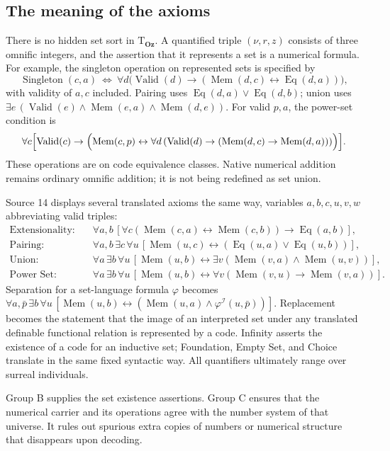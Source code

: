 \documentclass[11pt,letterpaper]{article}
\theoremstyle{definition}
\theoremstyle{remark}
\newcommand{\I}{\mathcal I}
\newcommand{\Oz}{\mathbf{Oz}}
\newcommand{\Valid}{\operatorname{Valid}}
\newcommand{\Eqc}{\operatorname{Eq}}
\newcommand{\Memc}{\operatorname{Mem}}
\newcommand{\Tth}{\mathrm{T}}
\begin{document}
\subsection{The meaning of the axioms}

There is no hidden set sort in $\Tth_{\Oz}$. A quantified triple $(\nu,r,z)$
consists of three omnific integers, and the assertion that it represents a set is
a numerical formula. For example, the singleton operation on represented sets is
specified by
\[
 \operatorname{Singleton}(c,a)\ \Longleftrightarrow\
 \forall d\bigl(\Valid(d)\to(\Memc(d,c)\leftrightarrow\Eqc(d,a))\bigr),
\]
with validity of $a,c$ included. Pairing uses $\Eqc(d,a)\lor\Eqc(d,b)$; union uses
$\exists e\,(\Valid(e)\land\Memc(e,a)\land\Memc(d,e))$. For valid $p,a$, the
power-set condition is
\[
 \forall c\Bigl[\Valid(c)\to\Bigl(\Memc(c,p)\leftrightarrow
 \forall d\,(\Valid(d)\to(\Memc(d,c)\to\Memc(d,a)))\Bigr)\Bigr].
\]
These operations are on code equivalence classes. Native numerical addition
remains ordinary omnific addition; it is not being redefined as set union.

Source 14 displays several translated axioms the same way, variables
$a,b,c,u,v,w$ abbreviating valid triples:
\begin{align*}
 \text{Extensionality:}\quad&\forall a,b\,[\forall c(\Memc(c,a)\leftrightarrow \Memc(c,b))\to \Eqc(a,b)],\\
 \text{Pairing:}\quad&\forall a,b\,\exists c\,\forall u\,[\Memc(u,c)\leftrightarrow(\Eqc(u,a)\lor \Eqc(u,b))],\\
 \text{Union:}\quad&\forall a\,\exists b\,\forall u\,[\Memc(u,b)\leftrightarrow\exists v(\Memc(v,a)\land \Memc(u,v))],\\
 \text{Power Set:}\quad&\forall a\,\exists b\,\forall u\,[\Memc(u,b)\leftrightarrow\forall v(\Memc(v,u)\to \Memc(v,a))].
\end{align*}
Separation for a set-language formula $\varphi$ becomes
$\forall a,\bar p\,\exists b\,\forall u\,[\Memc(u,b)\leftrightarrow(\Memc(u,a)\land\varphi^\I(u,\bar p))]$.
Replacement becomes the statement that the image of an interpreted set under any
translated definable functional relation is represented by a code. Infinity
asserts the existence of a code for an inductive set; Foundation, Empty Set, and
Choice translate in the same fixed syntactic way. All quantifiers ultimately range
over surreal individuals.

Group B supplies the set existence assertions. Group C ensures that the numerical
carrier and its operations agree with the number system of that universe. It
rules out spurious extra copies of numbers or numerical structure that disappears
upon decoding.
\end{document}
